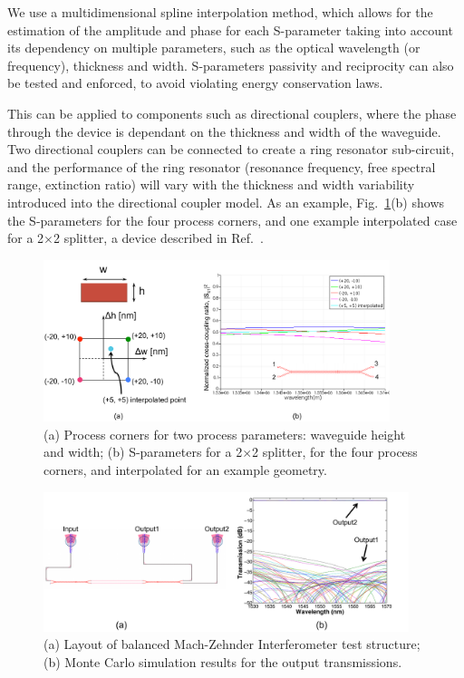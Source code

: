 \documentclass[journal]{spie}
\begin{document}
We use a multidimensional spline interpolation method, which allows for the estimation of the amplitude and phase for each S-parameter taking into account its dependency on multiple parameters, such as the optical wavelength (or frequency), thickness and width.  S-parameters passivity and reciprocity can also be tested and enforced, to avoid violating energy conservation laws.

This can be applied to components such as directional couplers, where the phase through the device is dependant on the thickness and width of the waveguide.  Two directional couplers can be connected to create a ring resonator sub-circuit, and the performance of the ring resonator (resonance frequency, free spectral range, extinction ratio) will vary with the thickness and width variability introduced into the directional coupler model.  As an example, Fig.~\ref{s-interpolation}(b) shows the S-parameters for the four process corners, and one example interpolated case for a 2$\times$2 splitter, a device described in Ref.~. 


\begin{figure}[tbp]
	\centering
	\includegraphics[width=0.9\textwidth]{../figs_paper/S_Interpolation.pdf}
    \caption[]{(a) Process corners for two process parameters: waveguide height and width; (b) S-parameters for  a 2$\times$2  splitter, for the four process corners, and interpolated for an example geometry.}
    \label{s-interpolation}
\end{figure}

\begin{figure}[tbp]
	\centering
	\includegraphics[width=0.95\textwidth]{../figs_paper/MZI_common_MC.pdf}
    \caption[]{(a) Layout of balanced Mach-Zehnder Interferometer test structure; (b) Monte Carlo simulation results for the output transmissions.}
    \label{MZI_common_MC}
\end{figure}
\end{document}
